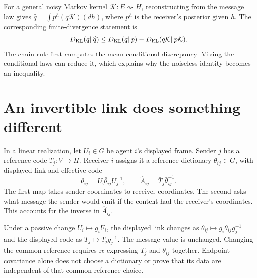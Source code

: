 For a general noisy Markov kernel $\mathcal K:E\rightsquigarrow H$, reconstructing from the message law gives $\widehat q=\int p^h(q\mathcal K)(dh)$, where $p^h$ is the receiver's posterior given $h$. The corresponding finite-divergence statement is
\begin{equation}
D_{\mathrm{KL}}(q\Vert\widehat q)
\leq D_{\mathrm{KL}}(q\Vert p)-D_{\mathrm{KL}}(q\mathcal K\Vert p\mathcal K).
\label{c17:noisy}
\end{equation}
The chain rule first computes the mean conditional discrepancy. Mixing the conditional laws can reduce it, which explains why the noiseless identity becomes an inequality.

\section{An invertible link does something different}

In a linear realization, let $U_i\in G$ be agent $i$'s displayed frame. Sender $j$ has a reference code $\bar T_j:V\to H$. Receiver $i$ assigns it a reference dictionary $\bar\theta_{ij}\in G$, with displayed link and effective code
\begin{equation}
\theta_{ij}=U_i\bar\theta_{ij}U_j^{-1},\qquad
\hat A_{ij}=\bar T_j\bar\theta_{ij}^{-1}.
\label{c17:dictionary}
\end{equation}
The first map takes sender coordinates to receiver coordinates. The second asks what message the sender would emit if the content had the receiver's coordinates. This accounts for the inverse in $\hat A_{ij}$.

Under a passive change $U_i\mapsto g_iU_i$, the displayed link changes as $\theta_{ij}\mapsto g_i\theta_{ij}g_j^{-1}$ and the displayed code as $T_j\mapsto T_jg_j^{-1}$. The message value is unchanged. Changing the common reference requires re-expressing $\bar T_j$ and $\bar\theta_{ij}$ together. Endpoint covariance alone does not choose a dictionary or prove that its data are independent of that common reference choice.

